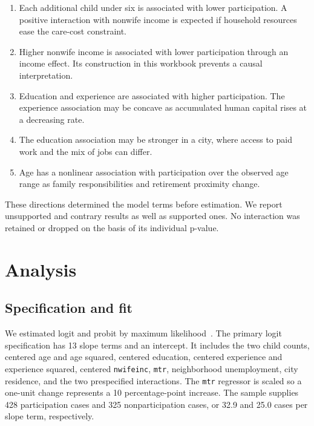\documentclass[conference]{IEEEtran}
\begin{document}
\begin{enumerate}
\item Each additional child under six is associated with lower participation. A positive interaction with nonwife income is expected if household resources ease the care-cost constraint.
\item Higher nonwife income is associated with lower participation through an income effect. Its construction in this workbook prevents a causal interpretation.
\item Education and experience are associated with higher participation. The experience association may be concave as accumulated human capital rises at a decreasing rate.
\item The education association may be stronger in a city, where access to paid work and the mix of jobs can differ.
\item Age has a nonlinear association with participation over the observed age range as family responsibilities and retirement proximity change.
\end{enumerate}

These directions determined the model terms before estimation. We report unsupported and contrary results as well as supported ones. No interaction was retained or dropped on the basis of its individual p-value.

\section{Analysis}
\subsection{Specification and fit}
We estimated logit and probit by maximum likelihood~\cite{statsmodels}. The primary logit specification has 13 slope terms and an intercept. It includes the two child counts, centered age and age squared, centered education, centered experience and experience squared, centered \texttt{nwifeinc}, \texttt{mtr}, neighborhood unemployment, city residence, and the two prespecified interactions. The \texttt{mtr} regressor is scaled so a one-unit change represents a 10 percentage-point increase. The sample supplies 428 participation cases and 325 nonparticipation cases, or 32.9 and 25.0 cases per slope term, respectively.
\end{document}
